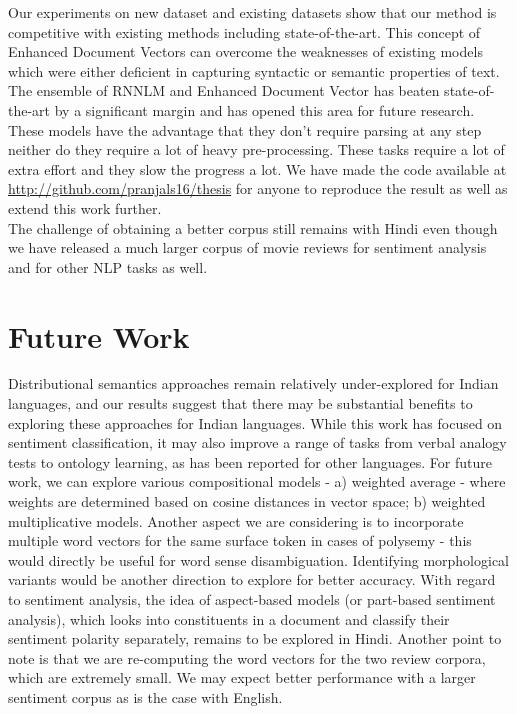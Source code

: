 Our experiments on new dataset and existing datasets show that our method is competitive with existing methods including state-of-the-art. This concept of Enhanced Document Vectors can overcome the weaknesses of existing models which were either deficient in capturing syntactic or semantic properties of text. The ensemble of RNNLM and Enhanced Document Vector has beaten state-of-the-art by a significant margin and has opened this area for future research. These models have the advantage that they don't require parsing at any step neither do they require a lot of heavy pre-processing. These tasks require a lot of extra effort and they slow the progress a lot. We have made the code available at \url{http://github.com/pranjals16/thesis} for anyone to reproduce the result as well as extend this work further.\\
The challenge of obtaining a better corpus still remains with Hindi even though we have released a much larger corpus of movie reviews for sentiment analysis and for other NLP tasks as well.

\section{Future Work}
\label{sec:future_work}
Distributional semantics approaches remain relatively under-explored for Indian languages, and our results suggest that there may be substantial benefits to exploring these approaches for Indian languages.  While this work has focused on sentiment classification, it may also improve a range of tasks from verbal analogy tests to ontology learning, as has been reported for other languages.
For future work, we can explore various compositional models - a) weighted average - where weights are determined based on cosine distances in vector space;  b) weighted multiplicative models. Another aspect we are considering is to incorporate multiple word vectors for the same surface token in cases of polysemy - this would directly be useful for word sense disambiguation.  Identifying morphological variants would be another direction to explore for better accuracy. With regard to sentiment analysis, the idea of aspect-based models (or part-based sentiment analysis), which looks into constituents in a document and classify their sentiment polarity separately, remains to be explored in Hindi. Another point to note is that we are re-computing the word vectors for the two review corpora, which are extremely small.  We may expect better performance  with a larger sentiment corpus as is the case with English.


